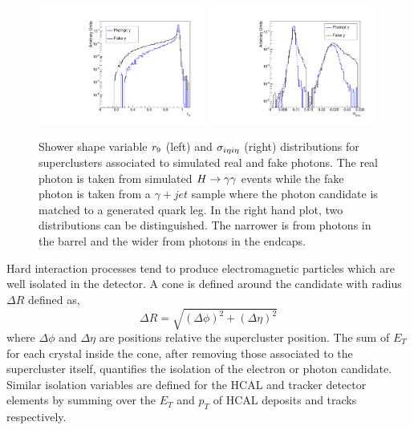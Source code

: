 \begin{figure}[hbt!]
\begin{center}
	\includegraphics[width=0.49\textwidth]{detector/r9eg.pdf}
	\includegraphics[width=0.49\textwidth]{detector/sieieeg.pdf}
	\caption{Shower shape variable $r_{9}$ (left) and $\sigma_{i\eta i\eta}$ (right) distributions 
	for superclusters associated to simulated real and fake photons. The real photon is taken
	from simulated $H\rightarrow\gamma\gamma$ events while the fake photon is taken from a $\gamma+jet$ sample
	where the photon candidate is matched to a generated quark leg. In the right hand plot,
	two distributions can be distinguished. The narrower is from photons in the barrel and
	the wider from photons in the endcaps. }
	\label{fig:showershape}
\end{center}
\end{figure}

Hard interaction processes tend to produce electromagnetic particles which are well
isolated in the detector. A cone is defined around the candidate with radius $\Delta R$ defined as,
\begin{equation}
\Delta R = \sqrt{(\Delta\phi)^{2}+(\Delta\eta)^{2}}
\end{equation}
where $\Delta\phi$ and $\Delta\eta$ are positions relative the supercluster position.
The sum of $E_{T}$ for each crystal inside the cone, after removing those associated 
to the supercluster itself, quantifies the isolation of the electron or photon candidate.
Similar isolation variables are defined for the HCAL and tracker detector elements by
summing over the $E_{T}$ and $p_{T}$ of HCAL deposits and tracks respectively.

